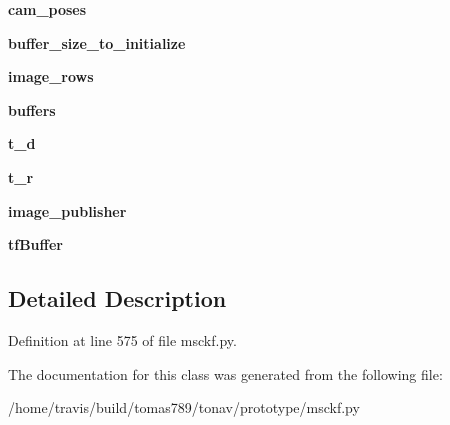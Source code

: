 \begin{DoxyCompactItemize}
\item 
\hypertarget{classmsckf_1_1_msckf_a9ac9d9d8888316a8b2ebf1b446f17e07}{{\bfseries cam\-\_\-poses}}\label{classmsckf_1_1_msckf_a9ac9d9d8888316a8b2ebf1b446f17e07}

\item 
\hypertarget{classmsckf_1_1_msckf_ae967978398f1652655b0ad7edd0f9af1}{{\bfseries buffer\-\_\-size\-\_\-to\-\_\-initialize}}\label{classmsckf_1_1_msckf_ae967978398f1652655b0ad7edd0f9af1}

\item 
\hypertarget{classmsckf_1_1_msckf_a8f68a433bdc94aa74889d127d9e91f31}{{\bfseries image\-\_\-rows}}\label{classmsckf_1_1_msckf_a8f68a433bdc94aa74889d127d9e91f31}

\item 
\hypertarget{classmsckf_1_1_msckf_a6e69e72653d9941528a1e4cecbc16371}{{\bfseries buffers}}\label{classmsckf_1_1_msckf_a6e69e72653d9941528a1e4cecbc16371}

\item 
\hypertarget{classmsckf_1_1_msckf_a2e46d6304ad2781ab231eb5cbaa935a0}{{\bfseries t\-\_\-d}}\label{classmsckf_1_1_msckf_a2e46d6304ad2781ab231eb5cbaa935a0}

\item 
\hypertarget{classmsckf_1_1_msckf_af788a1595dc960d3f58cc28ba33228d4}{{\bfseries t\-\_\-r}}\label{classmsckf_1_1_msckf_af788a1595dc960d3f58cc28ba33228d4}

\item 
\hypertarget{classmsckf_1_1_msckf_a8456c22259389af1d92a3926e7b7020e}{{\bfseries image\-\_\-publisher}}\label{classmsckf_1_1_msckf_a8456c22259389af1d92a3926e7b7020e}

\item 
\hypertarget{classmsckf_1_1_msckf_af1c0cd63952b6bd0ae751c39c4e6422a}{{\bfseries tf\-Buffer}}\label{classmsckf_1_1_msckf_af1c0cd63952b6bd0ae751c39c4e6422a}

\end{DoxyCompactItemize}


\subsection{Detailed Description}


Definition at line 575 of file msckf.\-py.



The documentation for this class was generated from the following file\-:\begin{DoxyCompactItemize}
\item 
/home/travis/build/tomas789/tonav/prototype/msckf.\-py\end{DoxyCompactItemize}
